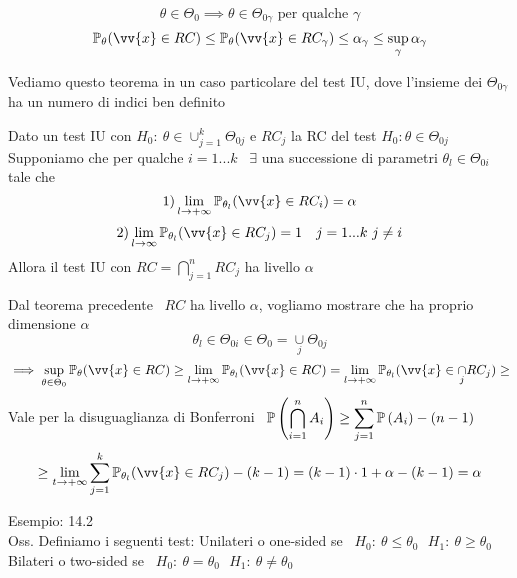 \begin{Dim}
    \[
    \theta\in\Theta_0 \implies \theta\in\Theta_{0\gamma} \text{ per qualche } \gamma
    \]
    \[
    \PP_{\theta}(\vv{x}\in RC) \le \PP_{\theta}(\vv{x}\in RC_{\gamma}) \le \alpha_{\gamma}\le \sup_{\gamma} \alpha_{\gamma}
    \]
\end{Dim}

\phantom{}


Vediamo questo teorema in un caso particolare del test IU, dove l'insieme dei $\Theta_{0\gamma}$ ha un numero di indici ben definito\\


\begin{teo}
    Dato un test IU con $H_0 : \ \theta\in \cup_{j=1}^k \Theta_{0j}$ e $RC_j$ la RC del test $H_0 : \theta\in \Theta_{0j}$\\
    Supponiamo che per qualche $i=1...k$ \ $\exists$ una successione di parametri $\theta_l \in \Theta_{0i}$ tale che\\
    \[
    1) \lim_{l\to+\infty} \PP_{\theta_l} (\vv{x}\in RC_i)=\alpha
    \]
    \[
    2) \lim_{l\to\infty} \PP_{\theta_l} (\vv{x}\in RC_j)= 1 \ \ \ j=1...k \ j\ne i
    \]
    Allora il test IU con $RC=\bigcap_{j=1}^n RC_j$ ha livello $\alpha$ 
\end{teo}

\begin{Dim}
    Dal teorema precedente \ $RC$ ha livello $\alpha$, vogliamo mostrare che ha proprio dimensione $\alpha$
    \[
    \theta_l \in \Theta_{0i} \in \Theta_0 = \underset{j}{\cup} \Theta_{0j}
    \]
    \[
    \implies \sup_{\theta\in\Theta_0} \PP_{\theta}(\vv{x}\in RC) \ge \lim_{l\to+\infty} \PP_{\theta_l} (\vv{x}\in RC) = \lim_{l\to +\infty} \PP_{\theta_l} (\vv{x}\in \underset{j}{\cap} RC_j) \ge\]
    Vale per la disuguaglianza di Bonferroni \ $\displaystyle\mathbb{P} \left( \bigcap_{i=1}^n A_i \right)\ge \sum\limits_{j=1}^{n} \mathbb{P} \left( A_i \right) - (n-1)$
    \[
    \ge \lim_{t\to+\infty} \Sum{j=1}{k} \PP_{\theta_l} (\vv{x}\in RC_j) - (k-1) = (k-1)\cdot 1 +\alpha -(k-1) = \alpha
    \]
\end{Dim}


Esempio: 14.2\\


Oss. Definiamo i seguenti test:
Unilateri o one-sided se
\ $H_0 : \ \theta\le \theta_0 \ \ \ H_1 : \  \theta\ge \theta_0$ \\
Bilateri o two-sided se \ $H_0 : \ \theta = \theta_0 \ \ \ H_1 : \  \theta \ne \theta_0$ \\ \\



